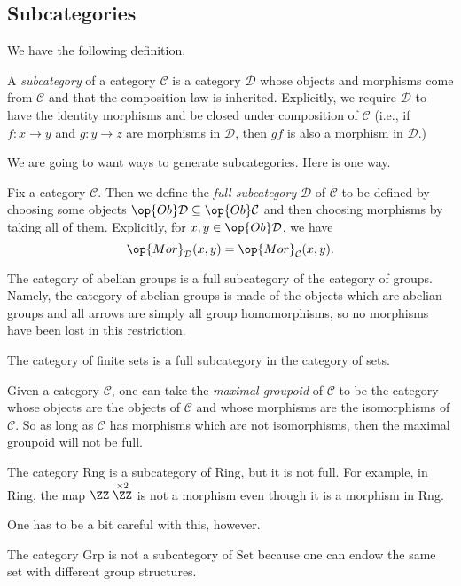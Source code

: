 \subsection{Subcategories}
We have the following definition.
\begin{definition}[Subcategory]
	A \textit{subcategory} of a category $\mathcal C$ is a category $\mathcal D$ whose objects and morphisms come from $\mathcal C$ and that the composition law is inherited. Explicitly, we require $\mathcal D$ to have the identity morphisms and be closed under composition of $\mathcal C$ (i.e., if $f:x\to y$ and $g:y\to z$ are morphisms in $\mathcal D$, then $gf$ is also a morphism in $\mathcal D$.)
\end{definition}
We are going to want ways to generate subcategories. Here is one way.
\begin{definition}
	Fix a category $\mathcal C$. Then we define the \textit{full subcategory} $\mathcal D$ of $\mathcal C$ to be defined by choosing some objects $\op{Ob}\mathcal D\subseteq\op{Ob}\mathcal C$ and then choosing morphisms by taking all of them. Explicitly, for $x,y\in\op{Ob}\mathcal D$, we have
	\[\op{Mor}_\mathcal D(x,y)=\op{Mor}_\mathcal C(x,y).\]
\end{definition}
\begin{example}
	The category of abelian groups is a full subcategory of the category of groups. Namely, the category of abelian groups is made of the objects which are abelian groups and all arrows are simply all group homomorphisms, so no morphisms have been lost in this restriction.
\end{example}
\begin{example}
	The category of finite sets is a full subcategory in the category of sets.
\end{example}
\begin{example}
	Given a category $\mathcal C$, one can take the \textit{maximal groupoid} of $\mathcal C$ to be the category whose objects are the objects of $\mathcal C$ and whose morphisms are the isomorphisms of $\mathcal C$. So as long as $\mathcal C$ has morphisms which are not isomorphisms, then the maximal groupoid will not be full.
\end{example}
\begin{example}
	The category $\mathrm{Rng}$ is a subcategory of $\mathrm{Ring}$, but it is not full. For example, in $\mathrm{Ring}$, the map $\ZZ\stackrel{\times2}\ZZ$ is not a morphism even though it is a morphism in $\mathrm{Rng}$.
\end{example}
One has to be a bit careful with this, however.
\begin{nex}
	The category $\mathrm{Grp}$ is not a subcategory of $\mathrm{Set}$ because one can endow the same set with different group structures.
\end{nex}

